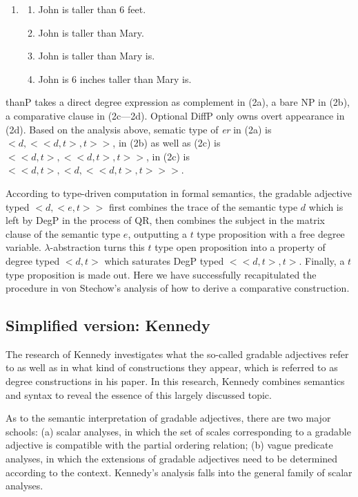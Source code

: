 \documentclass{ctexart}
\let \cite \parencite
\begin{document}
\begin{enumerate}[resume]
    \item

    \begin{enumerate}
        \item John is taller than 6 feet.
        \item John is taller than Mary.
        \item John is taller than Mary is.
        \item John is 6 inches taller than Mary is.
    \end{enumerate}

\end{enumerate}

thanP takes a direct degree expression as complement in (2a), a bare NP in (2b), a comparative clause in (2c—2d). Optional DiffP only owns overt appearance in (2d). Based on the analysis above, sematic type of \textit{er} in (2a) is $<d,<<d,t>,t>>$, in (2b) as well as (2c) is $<<d,t>,<<d,t>,t>>$, in (2c) is $<<d,t>,<d,<<d,t>,t>>>$.

According to type-driven computation in formal semantics, the gradable adjective typed $<d,<e,t>>$ first combines the trace of the semantic type $d$ which is left by DegP in the process of QR, then combines the subject in the matrix clause of the semantic type $e$, outputting a $t$ type proposition with a free degree variable. $\lambda$-abstraction turns this $t$ type open proposition into a property of degree typed $<d,t>$ which saturates DegP typed $<<d,t>,t>$. Finally, a $t$ type proposition is made out. Here we have successfully recapitulated the procedure in von Stechow’s analysis of how to derive a comparative construction.

\subsection{Simplified version: Kennedy}

The research of Kennedy investigates what the so-called gradable adjectives refer to as well as in what kind of constructions they appear, which is referred to as degree constructions in his paper\cite{kennedy1997}. In this research, Kennedy combines semantics and syntax to reveal the essence of this largely discussed topic.

As to the semantic interpretation of gradable adjectives, there are two major schools: (a) scalar analyses, in which the set of scales corresponding to a gradable adjective is compatible with the partial ordering relation\cite{cresswell1976,bierwisch1989}; (b) vague predicate analyses, in which the extensions of gradable adjectives need to be determined according to the context\cite{ginet1973,kamp2013,klein1980}. Kennedy’s analysis falls into the general family of scalar analyses.
\end{document}
